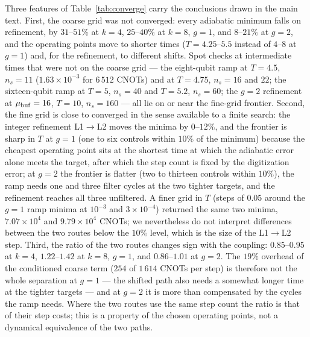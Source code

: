 \documentclass[aps,prc,reprint,superscriptaddress,floatfix,nofootinbib]{revtex4-2}
\begin{document}
Three features of Table~\ref{tab:converge} carry the conclusions drawn
in the main text.  First, the coarse grid was not converged: every
adiabatic minimum falls on refinement, by $31$--$51\%$ at $k=4$,
$25$--$40\%$ at $k=8$, $g=1$, and $8$--$21\%$ at $g=2$, and the
operating points move to shorter times ($T=4.25$--$5.5$ instead of
$4$--$8$ at $g=1$) and, for the refinement, to different shifts.  Spot
checks at intermediate times that were not on the coarse grid --- the
eight-qubit ramp at $T=4.5$, $n_s=11$ ($1.63\times10^{-3}$ for $6\,512$
CNOTs) and at $T=4.75$, $n_s=16$ and $22$; the sixteen-qubit ramp at
$T=5$, $n_s=40$ and $T=5.2$, $n_s=60$; the $g=2$ refinement at
$\mu_{\rm buf}=16$, $T=10$, $n_s=160$ --- all lie on or near the fine-grid
frontier.  Second, the fine grid is close to converged in the sense
available to a finite search: the integer refinement L1$\to$L2 moves the
minima by $0$--$12\%$, and the frontier is sharp in $T$ at $g=1$ (one to
six controls within $10\%$ of the minimum) because the cheapest operating
point sits at the shortest time at which the adiabatic error alone meets
the target, after which the step count is fixed by the digitization
error; at $g=2$ the frontier is flatter (two to thirteen controls within
$10\%$), the ramp needs one and three filter cycles at the two tighter
targets, and the refinement reaches all three unfiltered.  A finer grid
in $T$ (steps of $0.05$ around the $g=1$ ramp minima at $10^{-3}$ and
$3\times10^{-4}$) returned the same two minima, $7.07\times10^{4}$ and
$9.79\times10^{4}$ CNOTs; we nevertheless do not interpret differences
between the two routes below the $10\%$ level, which is the size of the
L1$\to$L2 step.  Third, the ratio of the two routes changes sign with
the coupling: $0.85$--$0.95$ at $k=4$, $1.22$--$1.42$ at $k=8$, $g=1$, and
$0.86$--$1.01$ at $g=2$.  The $19\%$ overhead of the conditioned coarse
term ($254$ of $1\,614$ CNOTs per step) is therefore not the whole
separation at $g=1$ --- the shifted path also needs a somewhat longer time
at the tighter targets --- and at $g=2$ it is more than compensated by the
cycles the ramp needs.  Where the two routes use the same step count the
ratio is that of their step costs; this is a property of the chosen
operating points, not a dynamical equivalence of the two paths.
\end{document}
